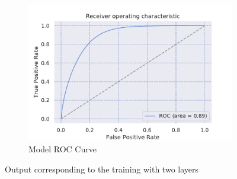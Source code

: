 \begin{figure}[H]
\begin{subfigure}[b]{0.3\textwidth}
         \centering
         \includegraphics[width=\textwidth]{figure_3/two_layer_only_ROC.pdf}
         \caption{Model ROC Curve }
         \label{fig:five over x}
     \end{subfigure}
        \caption{Output corresponding to the training with two layers}
        \label{fig:three graphs}
\end{figure}


